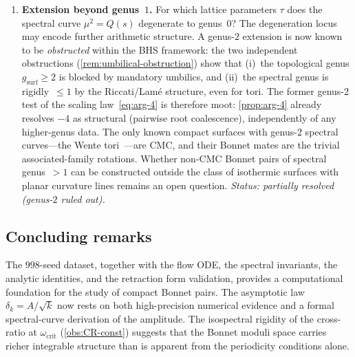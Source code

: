 \documentclass[11pt,a4paper]{article}
\theoremstyle{plain}
\theoremstyle{definition}
\theoremstyle{remark}
\begin{document}
\begin{enumerate}[label=\textbf{OP\arabic*.},nosep]
\item \textbf{Extension beyond genus~$1$.}
  For which lattice parameters $\tau$ does the spectral curve
  $\mu^2 = Q(s)$ degenerate to genus~$0$?  The degeneration locus
  may encode further arithmetic structure.
  A genus-$2$ extension is now known to be \emph{obstructed}
  within the BHS framework:
  the two independent obstructions
  (\cref{rem:umbilical-obstruction}) show that
  (i)~the topological genus $g_{\mathrm{surf}} \geq 2$ is
  blocked by mandatory umbilics, and
  (ii)~the spectral genus is rigidly~$\leq 1$
  by the Riccati/Lam\'e structure, even for tori.
  The former genus-$2$ test of the scaling
  law~\eqref{eq:arg-4} is therefore moot:
  \cref{prop:arg-4} already resolves $-4$ as structural
  (pairwise root coalescence), independently of any
  higher-genus data.
  The only known compact surfaces with genus-$2$ spectral
  curves---the Wente tori~\cite{Wen86,Bob91}---are CMC, and
  their Bonnet mates are the trivial associated-family rotations.
  Whether non-CMC Bonnet pairs of spectral genus~$>1$ can
  be constructed outside the class of isothermic surfaces
  with planar curvature lines remains an open question.
  \emph{Status: partially resolved (genus-$2$ ruled out).}
\end{enumerate}

\subsection{Concluding remarks}
The $998$-seed dataset, together with the flow ODE, the spectral
invariants, the analytic identities, and the retraction form
validation, provides a computational foundation
for the study of compact Bonnet pairs.  The asymptotic law
$\delta_k = A/\sqrt{k}$ now rests on both high-precision numerical
evidence and a formal spectral-curve derivation of the amplitude.
The isospectral rigidity of the cross-ratio at
$\omega_{\mathrm{crit}}$ (\cref{obs:CR-const}) suggests that
the Bonnet moduli space carries richer integrable structure than
is apparent from the periodicity conditions alone.


\appendix
\end{document}
